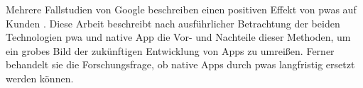 Mehrere Fallstudien von Google beschreiben einen positiven Effekt von \acp{pwa} auf Kunden \cite{GoogleShowCases}. Diese Arbeit beschreibt nach ausführlicher Betrachtung der beiden Technologien \ac{pwa} und native App die Vor- und Nachteile dieser Methoden, um ein grobes Bild der zukünftigen Entwicklung von Apps zu umreißen. Ferner behandelt sie die Forschungsfrage, ob native Apps durch \acp{pwa} langfristig ersetzt werden können.









